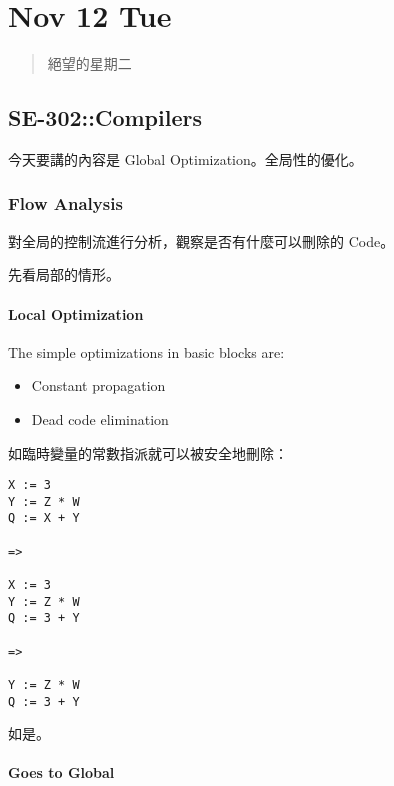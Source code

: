 \documentclass[
]{article}
\date{}
\begin{document}
\hypertarget{header-n2}{%
\section{Nov 12 Tue}\label{header-n2}}

\begin{quote}
絕望的星期二
\end{quote}

\hypertarget{header-n5}{%
\subsection{SE-302::Compilers}\label{header-n5}}

今天要講的內容是 Global Optimization。全局性的優化。

\hypertarget{header-n7}{%
\subsubsection{Flow Analysis}\label{header-n7}}

對全局的控制流進行分析，觀察是否有什麼可以刪除的 Code。

先看局部的情形。

\hypertarget{header-n10}{%
\paragraph{Local Optimization}\label{header-n10}}

The simple optimizations in basic blocks are:

\begin{itemize}
\item
  Constant propagation
\item
  Dead code elimination
\end{itemize}

如臨時變量的常數指派就可以被安全地刪除：

\begin{verbatim}
X := 3
Y := Z * W
Q := X + Y

=>

X := 3
Y := Z * W
Q := 3 + Y

=>

Y := Z * W
Q := 3 + Y
\end{verbatim}

如是。

\hypertarget{header-n20}{%
\paragraph{Goes to Global}\label{header-n20}}
\end{document}
